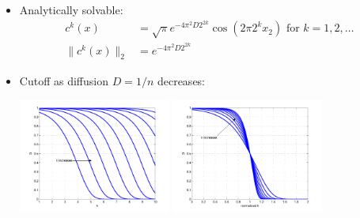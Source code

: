 \documentclass[12pt,t]{beamer}
\begin{document}
\begin{frame}
  \begin{itemize}
  \item Analytically solvable:
    \begin{align*}
      c^k(x) &= \sqrt{\pi} e^{-4 \pi^2 D 2 ^{2 k}}\cos(2 \pi 2^k x_2)
      \text{ for } k = 1,2,\ldots \\
      \|c^k(x)\|_2 &= e^{-4 \pi^2 D 2^{2 k}}
    \end{align*}
  \item Cutoff as diffusion $D = 1/n$ decreases:
    \begin{center}
      \includegraphics[width=5cm]{democutoff1}
      \includegraphics[width=5cm]{democutoff1n}
    \end{center}
  \end{itemize}
\end{frame}
\end{document}
